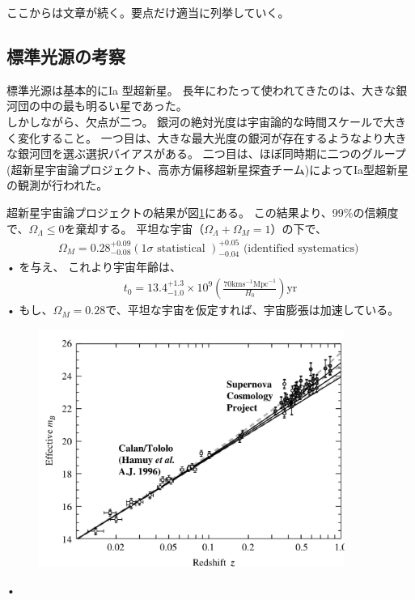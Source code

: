 \documentclass[11pt,a4paper,dvipdfmx]{jsarticle}
\theoremstyle{plain}
\theoremstyle{break}
\begin{document}
ここからは文章が続く。要点だけ適当に列挙していく。

\subsection{標準光源の考察}
標準光源は基本的にIa 型超新星。
長年にわたって使われてきたのは、大きな銀河団の中の最も明るい星であった。\\
しかしながら、欠点が二つ。
銀河の絶対光度は宇宙論的な時間スケールで大きく変化すること。
一つ目は、大きな最大光度の銀河が存在するようなより大きな銀河団を選ぶ選択バイアスがある。
二つ目は、ほぼ同時期に二つのグループ(超新星宇宙論プロジェクト、高赤方偏移超新星探査チーム)によってIa型超新星の観測が行われた。

超新星宇宙論プロジェクトの結果が図\ref{fig:1-1}にある。
この結果より、99\%の信頼度で、$\Omega_{\Lambda} \leq 0$を棄却する。
平坦な宇宙（$\Omega_{\Lambda} + \Omega_{M} = 1$）の下で、
\begin{align}
  \Omega_{M}=0.28_{-0.08}^{+0.09}(1 \sigma \text { statistical })_{-0.04}^{+0.05} \text { (identified systematics) }
\end{align}•%
を与え、
これより宇宙年齢は、
\begin{align}
  t_{0}=13.4_{-1.0}^{+1.3} \times 10^{9}\left(\frac{70 \mathrm{km} \mathrm{s}^{-1} \mathrm{Mpc}^{-1}}{H_{0}}\right) \mathrm{yr}
\end{align}•%
もし、$\Omega_M = 0.28$で、平坦な宇宙を仮定すれば、宇宙膨張は加速している。
\begin{figure}[h]
	\centering
	\includegraphics[width=10cm]{figure/fig1-1}
	\label{fig:1-1}
	\caption{}
\end{figure}•%
\end{document}
